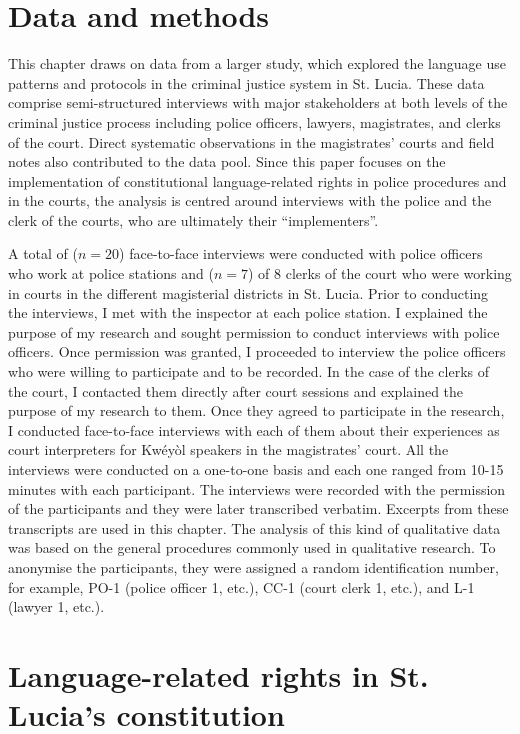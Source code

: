 \documentclass[output=paper,colorlinks,citecolor=brown]{langscibook}
\begin{document}
\section{Data and methods}

This chapter draws on data from a larger study, which explored the language use patterns and protocols in the criminal justice system in St. Lucia. These data comprise semi-structured interviews with major stakeholders at both levels of the criminal justice process including police officers, lawyers, magistrates, and clerks of the court. Direct systematic observations in the magistrates’ courts and field notes also contributed to the data pool. Since this paper focuses on the implementation of constitutional language-related rights in police procedures and in the courts, the analysis is centred around interviews with the police and the clerk of the courts, who are ultimately their “implementers”. 

A total of ($n=20$) face-to-face interviews were conducted with police officers who work at police stations and ($n=7$) of 8 clerks of the court who were working in courts in the different magisterial districts in St. Lucia. Prior to conducting the interviews, I met with the inspector at each police station. I explained the purpose of my research and sought permission to conduct interviews with police officers. Once permission was granted, I proceeded to interview the police officers who were willing to participate and to be recorded. In the case of the clerks of the court, I contacted them directly after court sessions and explained the purpose of my research to them. Once they agreed to participate in the research, I conducted face-to-face interviews with each of them about their experiences as court interpreters for Kwéyòl speakers in the magistrates’ court. All the interviews were conducted on a one-to-one basis and each one ranged from 10-15 minutes with each participant. The interviews were recorded with the permission of the participants and they were later transcribed verbatim. Excerpts from these transcripts are used in this chapter. The analysis of this kind of qualitative data was based on the general procedures commonly used in qualitative research. To anonymise the participants, they were assigned a random identification number, for example, PO-1 (police officer 1, etc.), CC-1 (court clerk 1, etc.), and L-1 (lawyer 1, etc.).


\section{Language-related rights in St. Lucia’s constitution}
\end{document}
